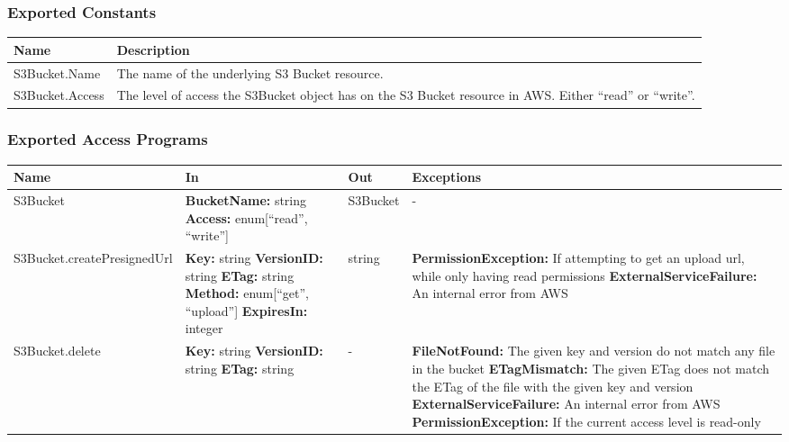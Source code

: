 \documentclass[12pt, titlepage]{article}
\begin{document}
\subsubsection{Exported Constants}

\begin{center}
  \begin{tabular}{p{4cm} p{12cm}}
    \hline
    \textbf{Name} & \textbf{Description} \\
    \hline
    S3Bucket.Name & The name of the underlying S3 Bucket resource. \\
    \hline
    S3Bucket.Access & The level of access the S3Bucket object has on
    the S3 Bucket resource in AWS. Either ``read'' or ``write''. \\
    \hline
  \end{tabular}
\end{center}

\subsubsection{Exported Access Programs}

\begin{center}
  \begin{tabular}{>{\raggedright}p{5cm} >{\raggedright}p{4cm}
    >{\raggedright}p{2cm} p{4cm}}
    \hline
    \textbf{Name} & \textbf{In} & \textbf{Out} & \textbf{Exceptions} \\
    \hline
    S3Bucket & \textbf{BucketName:} string \newline \textbf{Access:}
    enum[``read'', ``write''] & S3Bucket & - \\
    \hline
    S3Bucket.createPresignedUrl & \textbf{Key:} string \newline
    \textbf{VersionID:} string \newline \textbf{ETag:} string
    \newline \textbf{Method:} enum[``get'', ``upload''] \newline
    \textbf{ExpiresIn:} integer & string &
    \textbf{PermissionException:} If attempting to get an upload url,
    while only having read permissions \newline
    \textbf{ExternalServiceFailure:} An internal error from AWS \\
    \hline
    S3Bucket.delete & \textbf{Key:} string \newline
    \textbf{VersionID:} string \newline \textbf{ETag:} string & - &
    \textbf{FileNotFound:} The given key and version do not match any
    file in the bucket \newline \textbf{ETagMismatch:} The given ETag
    does not match the ETag of the file with the given key and
    version \newline \textbf{ExternalServiceFailure:} An internal
    error from AWS \newline \textbf{PermissionException:} If the
    current access level is read-only \\
    \hline
  \end{tabular}
\end{center}
\end{document}
